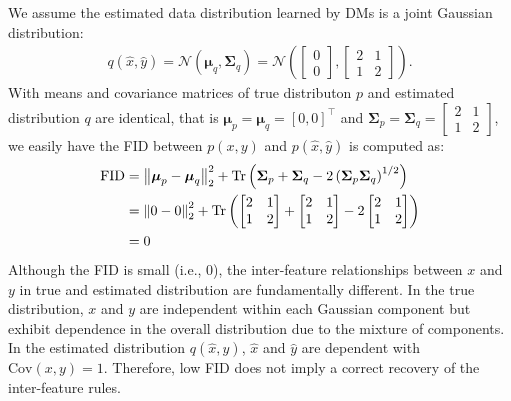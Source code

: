 We assume the estimated data distribution learned by DMs is a joint Gaussian distribution:
\begin{align}
\label{eq:true_dist}
    q(\hat{x}, \hat{y}) =\mathcal{N}(\boldsymbol{\mu}_q,\boldsymbol{\Sigma}_q) =\mathcal{N}\left(\begin{bmatrix} 0 \\ 0 \end{bmatrix}, \begin{bmatrix} 2 & 1 \\ 1 & 2 \end{bmatrix}\right).
\end{align}
With means and covariance matrices of true distributon $p$ and estimated distribution $q$ are identical, that is \(\boldsymbol{\mu}_p = \boldsymbol{\mu}_q = [0, 0]^\top\) and \(\boldsymbol{\Sigma}_p = \boldsymbol{\Sigma}_q = \begin{bmatrix} 2 & 1 \\ 1 & 2 \end{bmatrix}\), we easily have the FID between \( p(x, y) \) and \( p(\hat{x}, \hat{y}) \) is computed as:
\begin{align}
    \text{FID} &= \left\| \boldsymbol{\mu}_p - \boldsymbol{\mu}_q \right\|_2^2 + \text{Tr}\left( \boldsymbol{\Sigma}_p + \boldsymbol{\Sigma}_q - 2 \left( \boldsymbol{\Sigma}_p \boldsymbol{\Sigma}_q \right)^{1/2} \right)\notag\\
    &=\left\| 0 - 0 \right\|_2^2 + \text{Tr}\left( \begin{bmatrix} 2 & 1 \\ 1 & 2 \end{bmatrix} + \begin{bmatrix} 2 & 1 \\ 1 & 2 \end{bmatrix} - 2 \begin{bmatrix} 2 & 1 \\ 1 & 2 \end{bmatrix} \right)\notag\\
    &= 0
\end{align}
Although the FID is small (i.e., 0), the inter-feature relationships between $x$ and $y$ in true and estimated distribution are fundamentally different. In the true distribution, $x$ and $y$ are independent within each Gaussian component but exhibit dependence in the overall distribution due to the mixture of components. In the estimated distribution $q(\hat{x}, \hat{y})$, $\hat{x}$ and $\hat{y}$ are dependent with $\text{Cov}(x, y) = 1$. Therefore, low FID does not imply a correct recovery of the inter-feature rules.
